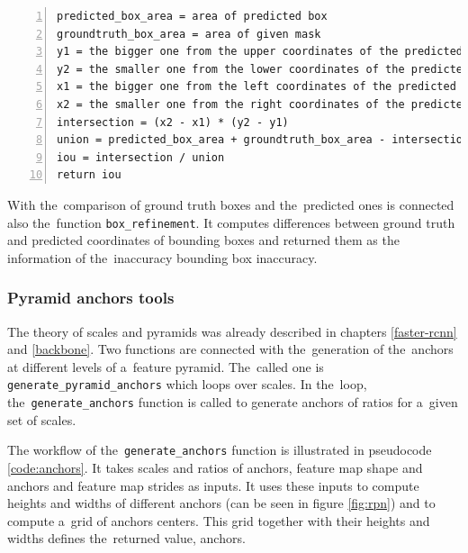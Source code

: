 {\scriptsize
\begin{lstlisting}[style=python, caption={compute\_iou}, captionpos=b, 
label=code:iou, deletekeywords={from, and},
backgroundcolor = \color{light-gray}, numbers=left, breaklines=true]
predicted_box_area = area of predicted box
groundtruth_box_area = area of given mask
y1 = the bigger one from the upper coordinates of the predicted and ground truth bboxes
y2 = the smaller one from the lower coordinates of the predicted and ground truth bboxes
x1 = the bigger one from the left coordinates of the predicted and ground truth bboxes
x2 = the smaller one from the right coordinates of the predicted and ground truth bboxes
intersection = (x2 - x1) * (y2 - y1)
union = predicted_box_area + groundtruth_box_area - intersection
iou = intersection / union
return iou
\end{lstlisting}}

With the~comparison of ground truth boxes and the~predicted ones is connected 
also the~function \verb|box_refinement|. It computes differences between ground 
truth and predicted coordinates of bounding boxes and returned them as the~
information of the~inaccuracy bounding box inaccuracy.


\subsubsection{Pyramid anchors tools}
\label{anchors-func}

The theory of scales and pyramids was already described in chapters 
\ref{faster-rcnn} and \ref{backbone}. Two functions are connected with
the~generation of the~anchors at different levels of a~feature pyramid. The~called 
one is \verb|generate_pyramid_anchors| which loops over scales. In the~loop,
the~\verb|generate_anchors| function is called to generate anchors of ratios for
a~given set of scales. 

The workflow of the~\verb|generate_anchors| function is illustrated in 
pseudocode \ref{code:anchors}. It takes scales and ratios of anchors, feature
map shape and anchors and feature map strides as inputs. It uses these inputs
to compute heights and widths of different anchors (can be seen in figure
\ref{fig:rpn}) and to compute a~grid of anchors centers. This grid together
with their heights and widths defines the~returned value, anchors.

